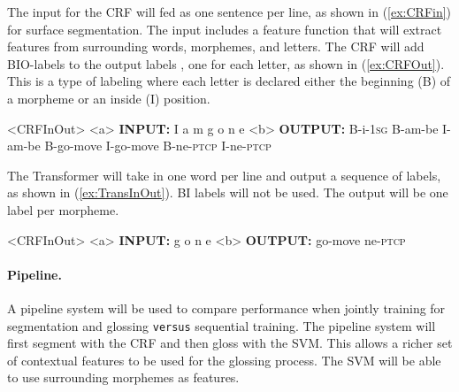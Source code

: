 The input for the CRF will fed as one sentence per line, as shown in (\ref{ex:CRFin}) for surface segmentation. The input includes a feature function that will extract features from surrounding words, morphemes, and letters. The CRF will add BIO-labels to the output labels \citep{ramshaw1999}, one for each letter, as shown in (\ref{ex:CRFOut}). This is a type of labeling where each letter is declared either the beginning (B) of a morpheme or an inside (I) position. 

\begin{singlespace}
\pex<CRFInOut>   
\label{ex:CRFInOut}
\a<a> \textbf{INPUT:} \hspace{7 mm} I \hspace{13 mm} a \hspace{14 mm} m \hspace{12 mm} g \hspace{15 mm} o \hspace{15 mm} n \hspace{15 mm} e 
\label{ex:CRFin}
\a<b> \textbf{OUTPUT:} B-i-1\textsc{sg} \hspace{1 mm} B-am-be \hspace{1 mm} I-am-be \hspace{1 mm} B-go-move \hspace{1 mm} I-go-move \hspace{1 mm} B-ne-\textsc{ptcp} \hspace{1 mm} I-ne-\textsc{ptcp}
\label{ex:CRFOut}
\xe
\end{singlespace}

The Transformer will take in one word per line and output a sequence of labels, as shown in (\ref{ex:TransInOut}). BI labels will not be used. The output will be one label per morpheme. 

\begin{singlespace}
\pex<CRFInOut>   
\label{ex:TransInOut}
\a<a> \textbf{INPUT:} \hspace{3 mm} g \hspace{2 mm} o \hspace{2 mm} n \hspace{2 mm} e 
\label{ex:Transin}
\a<b> \textbf{OUTPUT:} \hspace{3 mm} go-move \hspace{1 mm} ne-\textsc{ptcp} 
\label{ex:TransOut}
\xe
\end{singlespace}

\paragraph{Pipeline.}
A pipeline system will be used to compare performance when jointly training for segmentation and glossing {\tt versus} sequential training. 
The pipeline system will first segment with the CRF and then gloss with the SVM. This allows a richer set of contextual features to be used for the glossing process. The SVM will be able to  use surrounding morphemes as features.   

